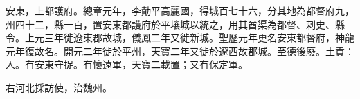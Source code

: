 \begin{pinyinscope}
 安東，上都護府。總章元年，李勣平高麗國，得城百七十六，分其地為都督府九，州四十二，縣一百，置安東都護府於平壤城以統之，用其酋渠為都督、刺史、縣令。上元三年徙遼東郡故城，儀鳳二年又徙新城。聖歷元年更名安東都督府，神龍元年復故名。開元二年徙於平州，天寶二年又徙於遼西故郡城。至德後廢。土貢：人。有安東守捉。有懷遠軍，天寶二載置；又有保定軍。



 右河北採訪使，治魏州。



\end{pinyinscope}
